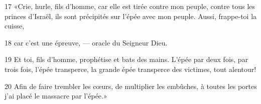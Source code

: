 17 «Crie, hurle, fils d’homme, car elle est tirée contre mon peuple, contre tous les princes d’Israël, ils sont précipités sur l’épée avec mon peuple. Aussi, frappe-toi la cuisse,

18 car c’est une épreuve, --- oracle du Seigneur Dieu.

19 Et toi, fils d’homme, prophétise et bats des mains. L’épée par deux fois, par trois fois, l’épée transperce, la grande épée transperce des victimes, tout alentour!

20 Afin de faire trembler les cœurs, de multiplier les embûches, à toutes les portes j’ai placé le massacre par l’épée.»